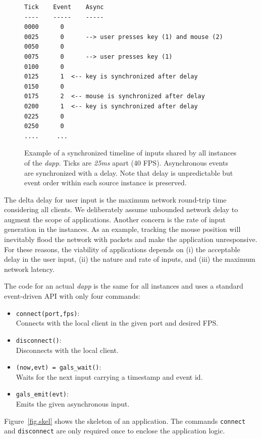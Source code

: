 \documentclass[sigplan,screen]{acmart}
\newcommand{\dapp}{\emph{dapp}\xspace}
\begin{document}
\begin{figure}[t]
{\scriptsize
\begin{verbatim}
Tick    Event    Async
----    -----    -----
0000      0
0025      0      --> user presses key (1) and mouse (2)
0050      0
0075      0      --> user presses key (1)
0100      0
0125      1  <-- key is synchronized after delay
0150      0
0175      2  <-- mouse is synchronized after delay
0200      1  <-- key is synchronized after delay
0225      0
0250      0
....     ...
\end{verbatim}
}
  \caption{
    \label{fig.timeline}
    Example of a synchronized timeline of inputs shared by all instances of the
    \dapp.
    Ticks are \emph{25ms} apart (40 FPS).
    Asynchronous events are synchronized with a delay.
    Note that delay is unpredictable but event order within each source
    instance is preserved.
  }
\end{figure}

The delta delay for user input is the maximum network round-trip time
considering all clients.
We deliberately assume unbounded network delay to augment the scope of
applications.
Another concern is the rate of input generation in the instances.
As an example, tracking the mouse position will inevitably flood the network
with packets and make the application unresponsive.
For these reasons, the viability of applications depends on
    (i) the acceptable delay in the user input,
    (ii) the nature and rate of inputs, and
    (iii) the maximum network latency.

The code for an actual \dapp is the same for all instances and uses a standard
event-driven API with only four commands:
\begin{itemize}
\item \texttt{connect(port,fps)}:        \\Connects with the local client in the given port and desired FPS.
\item \texttt{disconnect()}:             \\Disconnects with the local client.
\item \texttt{(now,evt) = gals\_wait()}: \\Waits for the next input carrying a timestamp and event id.
\item \texttt{gals\_emit(evt)}:          \\Emits the given asynchronous input.
\end{itemize}
Figure~\ref{fig.skel} shows the skeleton of an application.
The commands \texttt{connect} and \texttt{disconnect} are only required once to
enclose the application logic.
\end{document}
